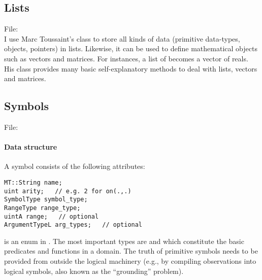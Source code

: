 \documentclass[10pt,twoside,twocolumn,fleqn]{article}
\begin{document}

\subsection{Lists}

File: \\

I use Marc Toussaint's  class to store all kinds of data (primitive
data-types, objects, pointers) in lists. Likewise, it can be used to define
mathematical objects such as vectors and matrices. For instances, a list of
 becomes a vector of reals. His class provides many basic
self-explanatory methods to deal with lists, vectors and matrices.



\subsection{Symbols}

File: \\

\paragraph{Data structure}

A symbol consists of the following attributes:
\begin{lstlisting}
MT::String name;
uint arity;   // e.g. 2 for on(.,.)
SymbolType symbol_type;
RangeType range_type;
uintA range;   // optional
ArgumentTypeL arg_types;   // optional
\end{lstlisting}
 is an enum in . The most important types
are  and  which constitute the basic
predicates and functions in a domain.  The truth of primitive symbols 
needs to be provided from outside the logical machinery (e.g., by compiling
observations into logical symbols, also known as the ``grounding''
problem).
\end{document}
